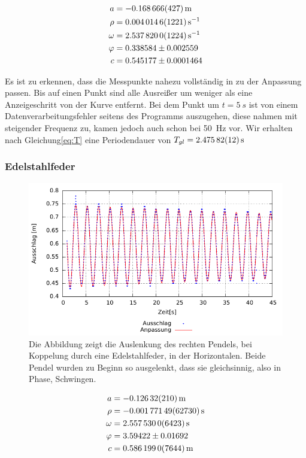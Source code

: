 \begin{align*}
	a               &= \SI{-0.168666       \pm 0.000427 }{m}    \\
	\rho               &= \SI{0.0040146      \pm 0.0001221}{\per \second}    \\
	\omega               &= \SI{2.53782          \pm 0.0001224}{\per \second}   \\
	\varphi              & = 0.338584        \pm  0.002559     \\
	c              & = 0.545177     \pm  0.0001464    \\
\end{align*}


Es ist zu erkennen, dass die Messpunkte nahezu vollständig in zu der Anpassung passen. Bis auf einen Punkt sind alle Ausreißer um weniger als eine Anzeigeschritt von der Kurve entfernt. Bei dem Punkt um $t=\SI{5}{s}$ ist von einem Datenverarbeitungsfehler seitens des Programms auszugehen, diese nahmen mit steigender Frequenz zu, kamen jedoch auch schon bei \SI{50}{Hz} vor. Wir erhalten nach Gleichung\ref{eq:T} eine Periodendauer von $T_{gl}= \SI{2.47582 \pm 0.00012}{s}$



\subsubsection*{Edelstahlfeder}



\begin{figure}[h!]
	\centering
	\includegraphics[width=0.7\linewidth]{Auswertung/stahl/gleich/stahlglA}
	\caption{Die Abbildung zeigt die Auslenkung des rechten Pendels, bei Koppelung durch eine Edelstahlfeder, in der Horizontalen. Beide Pendel wurden zu Beginn so ausgelenkt, dass sie gleichsinnig, also in Phase, Schwingen.}
	\label{fig:stahlgl}
\end{figure}

\begin{align*}
a               &= \SI{ -0.12632        \pm 0.0021  }{m}     \\
\rho               &=\SI{ -0.00177149     \pm 0.0006273}{\per s}    \\
\omega               &= \SI{2.55753         \pm 0.0006423 }{\per s}    \\
\varphi               &= 3.59422         \pm 0.01692     \\
c               &=\SI{ 0.586199        \pm 0.0007644}{m}     \\
\end{align*}



